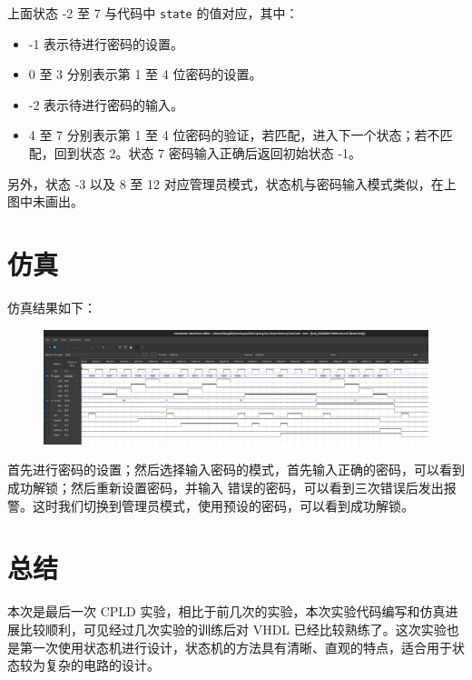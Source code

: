 \documentclass[a4paper]{article}
\begin{document}
上面状态 -2 至 7 与代码中 \texttt{state} 的值对应，其中：

\begin{itemize}
    \item -1 表示待进行密码的设置。
    \item 0 至 3 分别表示第 1 至 4 位密码的设置。
    \item -2 表示待进行密码的输入。
    \item 4 至 7 分别表示第 1 至 4 位密码的验证，若匹配，进入下一个状态；若不匹配，回到状态 2。状态 7 密码输入正确后返回初始状态 -1。
\end{itemize}

另外，状态 -3 以及 8 至 12 对应管理员模式，状态机与密码输入模式类似，在上图中未画出。

\section{仿真}

仿真结果如下：

\begin{figure}[H]
    \centering
    \includegraphics[width=1\textwidth]{./assets/simulation.png}
\end{figure}

首先进行密码的设置；然后选择输入密码的模式，首先输入正确的密码，可以看到成功解锁；然后重新设置密码，并输入
错误的密码，可以看到三次错误后发出报警。这时我们切换到管理员模式，使用预设的密码，可以看到成功解锁。

\section{总结}

本次是最后一次 CPLD 实验，相比于前几次的实验，本次实验代码编写和仿真进展比较顺利，可见经过几次实验的训练后对 VHDL 已经比较熟练了。这次实验也是第一次使用状态机进行设计，状态机的方法具有清晰、直观的特点，适合用于状态较为复杂的电路的设计。
\end{document}
